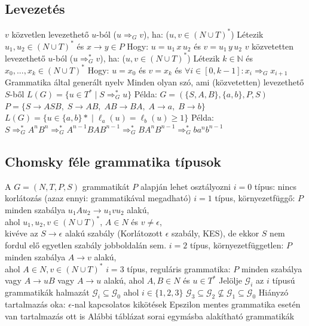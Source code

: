 \documentclass[12pt,a4paper]{article}
\newcommand{\gto}{\Rightarrow_G}
\newcommand{\gtos}{\Rightarrow_G^*}
\begin{document}
\subsection{Levezetés}

\begin{outline}
	\1 $v$ közvetlen levezethető $u$-ból ($u \gto v$), ha: \;\; ($u,v \in (N \cup T)^*$)
		\2 Létezik $u_1,u_2 \in (N \cup T)^*$ és $x \to y \in P$
		\2 Hogy: $u=u_1 \, x \, u_2$ és $v=u_1 \, y \, u_2$
	\1 $v$ közvetetten levezethető $u$-ból ($u \gtos v$), ha: \;\; ($u,v \in (N \cup T)^*$)
		\2 Létezik $k \in \mathbb{N}$ és $x_0,...,x_k \in (N \cup T)^*$
		\2 Hogy: $u=x_0$ és $v = x_k$ és $\forall i \in [0,k-1]: x_i \gto x_{i+1}$
	\1 Grammatika által generált nyelv
		\2 Minden olyan szó, ami (közvetetten) levezethető $S$-ből
		\2 $L(G) = \{u \in T^* \; | \; S \gtos u \}$
	\1 Példa: $G=(\{S,A,B\}, \{a,b\}, P, S)$
		\2 $P=\{S \to ASB,\; S \to AB,\; AB \to BA,\; A \to a,\; B \to b \}$
		\2 $L(G) = \{u \in \{a,b\}* \;|\; \ell_a(u) = \ell_b(u) \ge 1 \}$
		\2 Példa: $S \gtos A^nB^n \gtos A^{n-1}BAB^{n-1} \gtos BA^nB^{n-1} \gtos ba^nb^{n-1}$
\end{outline}

\pagebreak

\subsection{Chomsky féle grammatika típusok}

\begin{outline}
	\1 A $G=(N,T,P,S)$ grammatikát $P$ alapján lehet osztályozni
	\1 $i=0$ típus: nincs korlátozás (azaz ennyi: grammatikával megadható)
	\1 $i=1$ típus, környezetfüggő: $P$ minden szabálya $u_1Au_2 \to u_1vu_2$ alakú,\\
	ahol $u_1,u_2,v \in (N \cup T)^*$, $A \in N$ és $v \ne \epsilon$,\\
	kivéve az $S \to \epsilon$ alakú szabály (Korlátozott $\epsilon$ szabály, KES), de ekkor $S$ nem fordul elő egyetlen szabály jobboldalán sem.
	\1 $i=2$ típus, környezetfüggetlen: $P$ minden szabálya $A \to v$ alakú,\\
	ahol $A \in N, v \in (N \cup T)^*$
	\1 $i=3$ típus, reguláris grammatika: $P$ minden szabálya\\
	vagy $A \to uB$ vagy $A \to u$ alakú, ahol $A,B \in N$ és $u \in T^*$
	\1 Jelölje $\mathcal{G}_i$ az $i$ típusú grammatikák halmazát
		\2 $\mathcal{G}_i \subseteq \mathcal{G}_0$ ahol $i \in \{1,2,3\}$
		\2 $\mathcal{G}_3 \subseteq \mathcal{G}_2 \not \subseteq \mathcal{G}_1 \subseteq \mathcal{G}_0$
			\3 Hiányzó tartalmazás oka: $\epsilon$-nal kapcsolatos kikötések
			\3 Epszilon mentes grammatika esetén van tartalmazás ott is
	\1 Alábbi táblázat sorai egymásba alakítható grammatikák
\end{outline}
\end{document}
